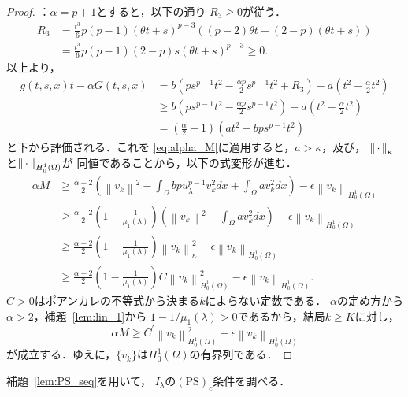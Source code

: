\begin{proof}
 ：$\alpha = p + 1$とすると，以下の通り
 $R_3 \geq 0$が従う．
 \begin{align*}
  R_3 &= \frac{t^3}{6} p(p-1)(\theta t + s)^{p-3} \left( (p-2)\theta t
  + (2-p) (\theta t + s)\right) \\
  &= \frac{t^3}{6}p(p-1)(2-p) s (\theta t + s)^{p-3} \geq 0.
 \end{align*}
 以上より，
 \begin{align*}
  g(t, s, x)t - \alpha G(t, s, x) &= b\left( ps^{p-1}t^2 -
  \frac{\alpha p}{2} s^{p-1} t^2 + R_3 \right) - a \left( t^2 -
  \frac{\alpha}{2} t^2 \right) \\
  & \geq b\left( ps^{p-1}t^2 -
  \frac{\alpha p}{2} s^{p-1} t^2 \right) - a \left( t^2 -
  \frac{\alpha}{2} t^2 \right) \\
  & = \left( \frac{\alpha}{2} - 1 \right) \left( at^2 - bps^{p-1} t^2 \right)
 \end{align*}
 と下から評価される．これを
 \eqref{eq:alpha_M}に適用すると，$a >
 \kappa$，及び，
 $\left\|\, \cdot \, \right\|_\kappa$と$\left\|\, \cdot \, \right\|_{H_0^1(\Omega)}$が
 同値であることから，以下の式変形が進む．
 \begin{align*}
  \alpha M &\geq \frac{\alpha-2}{2} \left( \left\| v_k \right\|^2 -
  \int_\Omega bp \underline{u}_\lambda^{p-1} v_k^2 dx + \int_\Omega
  av_k^2 dx \right) - \epsilon \left\| v_k \right\|_{H_0^1(\Omega)} \\
  & \geq \frac{\alpha -2}{2} \left( 1 - \frac{1}{\mu_1(\lambda)} \right)
  \left( \left\| v_k \right\|^2 + \int_\Omega av_k^2 dx \right)
  - \epsilon \left\|
  v_k \right\|_{H_0^1(\Omega)} \\
  & \geq \frac{\alpha -2}{2} \left( 1 - \frac{1}{\mu_1(\lambda)}
  \right) \left\| v_k \right\|_\kappa^2
  - \epsilon \left\|
  v_k \right\|_{H_0^1(\Omega)} \\
  & \geq  \frac{\alpha -2}{2} \left( 1 - \frac{1}{\mu_1(\lambda)}
  \right) C \left\| v_k \right\|_{H_0^1(\Omega)}^2 - \epsilon \left\|
  v_k \right\|_{H_0^1(\Omega)}.
 \end{align*}
 $C >0$はポアンカレの不等式から決まる$k$によらない定数である．
 $\alpha$の定め方から$\alpha > 2$，補題~\ref{lem:lin_1}から
 $1 - 1/\mu_1(\lambda) > 0$であるから，結局$k \geq K$に対し，
 \[
  \alpha M \geq C^\prime \left\| v_k \right\|_{H_0^1(\Omega)}^2 - \epsilon
 \left\| v_k \right\|_{H_0^1(\Omega)}
 \]
 が成立する．ゆえに，$\{ v_k \}$は$H_0^1(\Omega)$の有界列である． \qedhere
\end{proof}

補題~\ref{lem:PS_seq}を用いて，
$I_\lambda$の$(\mathrm{PS})_c$条件を調べる．

